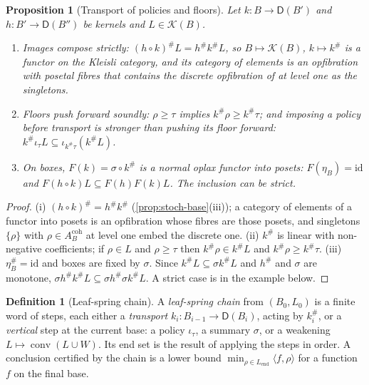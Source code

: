 \documentclass[11pt]{article}
\newtheorem{proposition}[theorem]{Proposition}
\theoremstyle{definition}
\newtheorem{definition}[theorem]{Definition}
\theoremstyle{remark}
\newcommand{\D}{\mathsf{D}}
\newcommand{\id}{\mathrm{id}}
\begin{document}
\begin{proposition}[Transport of policies and floors]\label{prop:floortransport}
Let $k\colon B\to\D(B')$ and $h\colon B'\to\D(B'')$ be kernels and $L\in\mathcal K(B)$.
\begin{enumerate}[label=(\roman*)]
\item Images compose strictly: $(h\circ k)^\#L=h^\#k^\#L$, so $B\mapsto\mathcal K(B)$, $k\mapsto k^\#$ is a functor on the
  Kleisli category, and its category of elements is an opfibration with posetal fibres that contains the discrete opfibration of
  \cite[Prop.~3.3]{Conditionals} at level one as the singletons.
\item Floors push forward soundly: $\rho\ge\tau$ implies $k^\#\rho\ge k^\#\tau$; and imposing a policy before transport is
  stronger than pushing its floor forward: $k^\#\iota_\tau L\subseteq\iota_{k^\#\tau}(k^\#L)$.
\item On boxes, $F(k)=\sigma\circ k^\#$ is a normal oplax functor into posets: $F(\eta_B)=\id$ and
  $F(h\circ k)L\subseteq F(h)F(k)L$. The inclusion can be strict.
\end{enumerate}
\end{proposition}
\begin{proof}
(i) $(h\circ k)^\#=h^\#k^\#$ (\cref{prop:stoch-base}(iii)); a category of elements of a functor into posets is an opfibration
whose fibres are those posets, and singletons $\{\rho\}$ with $\rho\in A^{\mathrm{coh}}_B$ at level one embed the discrete one.
(ii) $k^\#$ is linear with non-negative coefficients; if $\rho\in L$ and $\rho\ge\tau$ then $k^\#\rho\in k^\#L$ and
$k^\#\rho\ge k^\#\tau$. (iii) $\eta_B^\#=\id$ and boxes are fixed by $\sigma$. Since $k^\#L\subseteq\sigma k^\#L$ and $h^\#$ and
$\sigma$ are monotone, $\sigma h^\#k^\#L\subseteq\sigma h^\#\sigma k^\#L$. A strict case is in the example below.
\end{proof}

\begin{definition}[Leaf-spring chain]\label{def:leafspring}
A \emph{leaf-spring chain} from $(B_0,L_0)$ is a finite word of steps, each either a \emph{transport} $k_i\colon B_{i-1}\to\D(B_i)$,
acting by $k_i^\#$, or a \emph{vertical} step at the current base: a policy $\iota_\tau$, a summary $\sigma$, or a weakening
$L\mapsto\operatorname{conv}(L\cup W)$. Its end set is the result of applying the steps in order. A conclusion certified by the
chain is a lower bound $\min_{\rho\in L_{\mathrm{end}}}\langle f,\rho\rangle$ for a function $f$ on the final base.
\end{definition}
\end{document}
